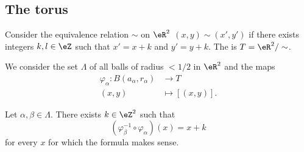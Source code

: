 \subsection{The torus}

\begin{definition}	\label{DEFooANNJooNfvwCK}
	Consider the equivalence relation \( \sim\) on \( \eR^2\) \( (x,y)\sim(x',y')\) if there exists integers \( k,l\in \eZ\) such that \( x'=x+k\) and \( y'=y+k\). The  is \( T=\eR^2/\sim\).

	We consider the set \( \Lambda\) of all balls of radius \( <1/2\) in \( \eR^2\) and the maps
	\begin{equation}
		\begin{aligned}
			\varphi_{\alpha}\colon B(a_{\alpha},r_{\alpha}) & \to T            \\
			(x,y)                                           & \mapsto [(x,y)].
		\end{aligned}
	\end{equation}
\end{definition}

\begin{lemma}	\label{LEMooLCQSooRMmcLM}
	Let \( \alpha,\beta\in\Lambda\). There exists \( k\in \eZ^2\) such that
	\begin{equation}
		(\varphi_{\beta}^{-1}\circ\varphi_{\alpha})(x)=x+k
	\end{equation}
	for every \( x\) for which the formula makes sense.
\end{lemma}

